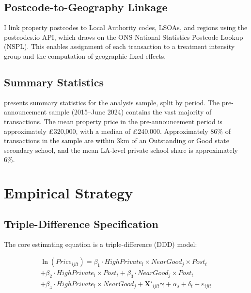 \documentclass[12pt]{article}
\begin{document}
\subsection{Postcode-to-Geography Linkage}

I link property postcodes to Local Authority codes, LSOAs, and regions using the postcodes.io API, which draws on the ONS National Statistics Postcode Lookup (NSPL). This enables assignment of each transaction to a treatment intensity group and the computation of geographic fixed effects.

\subsection{Summary Statistics}



 presents summary statistics for the analysis sample, split by period. The pre-announcement sample (2015--June 2024) contains the vast majority of transactions. The mean property price in the pre-announcement period is approximately \pounds320,000, with a median of \pounds240,000. Approximately 86\% of transactions in the sample are within 3km of an Outstanding or Good state secondary school, and the mean LA-level private school share is approximately 6\%.


\section{Empirical Strategy}\label{sec:strategy}

\subsection{Triple-Difference Specification}

The core estimating equation is a triple-difference (DDD) model:

\begin{multline}\label{eq:ddd}
    \ln(Price_{ijlt}) = \beta_1 \cdot HighPrivate_l \times NearGood_j \times Post_t \\
    + \beta_2 \cdot HighPrivate_l \times Post_t + \beta_3 \cdot NearGood_j \times Post_t \\
    + \beta_4 \cdot HighPrivate_l \times NearGood_j + \mathbf{X}'_{ijlt}\boldsymbol{\gamma} + \alpha_s + \delta_t + \varepsilon_{ijlt}
\end{multline}
\end{document}
